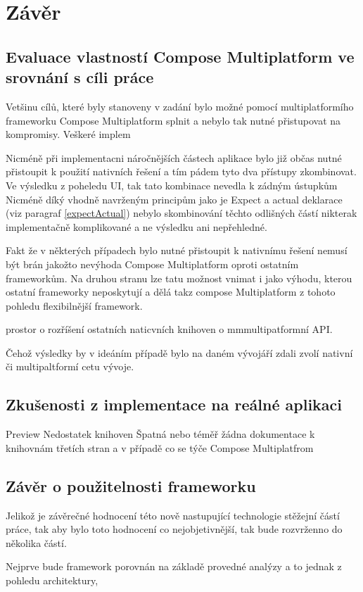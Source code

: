 \chapter{Závěr}

\section{Evaluace vlastností Compose Multiplatform ve srovnání s cíli práce}
Vetšinu cílů, které byly stanoveny v zadání bylo možné pomocí multiplatformího frameworku Compose Multiplatform splnit a nebylo tak
nutné přistupovat na kompromisy. Veškeré implem

Nicméně při implementacni náročnějších částech aplikace bylo již občas nutné přistoupit k použití nativních řešení a tím pádem tyto dva přístupy zkombinovat.
Ve výsledku z poheledu UI, tak tato kombinace nevedla k zádným ústupkům
Nicméně díký vhodně navrženým principům jako je Expect a actual deklarace (viz paragraf \ref{expectActual}) nebylo skombinování těchto odlišných částí nikterak
implementačně komplikované a ne výsledku ani nepřehledné. 

Fakt že v některých případech bylo nutné přistoupit k nativnímu řešení nemusí být brán jakožto nevýhoda Compose Multiplatform oproti ostatním frameworkům.
Na druhou stranu lze tatu možnost vnimat i jako výhodu, kterou ostatní frameworky neposkytují a dělá takz compose Multiplatform z tohoto pohledu flexibilnější
framework.

prostor o rozříšení ostatních naticvních knihoven o mmmultipatformní API. 

Čehož výsledky by v ideáním případě bylo na daném vývojáří zdali zvolí nativní či multipaltformí cetu vývoje. 

\section{Zkušenosti z implementace na reálné aplikaci}
Preview
Nedostatek knihoven
Špatná nebo téměř žádna dokumentace k knihovnám třetích stran a v případě co se týče Compose Multiplatfrom
\section{Závěr o použitelnosti frameworku}
Jelikož je závěrečné hodnocení této nově nastupující technologie stěžejní částí práce, tak aby bylo toto hodnocení co 
nejobjetivnější, tak bude rozvrženno do několika částí.

Nejprve bude framework porovnán na základě provedné analýzy a to jednak z pohledu architektury, 

